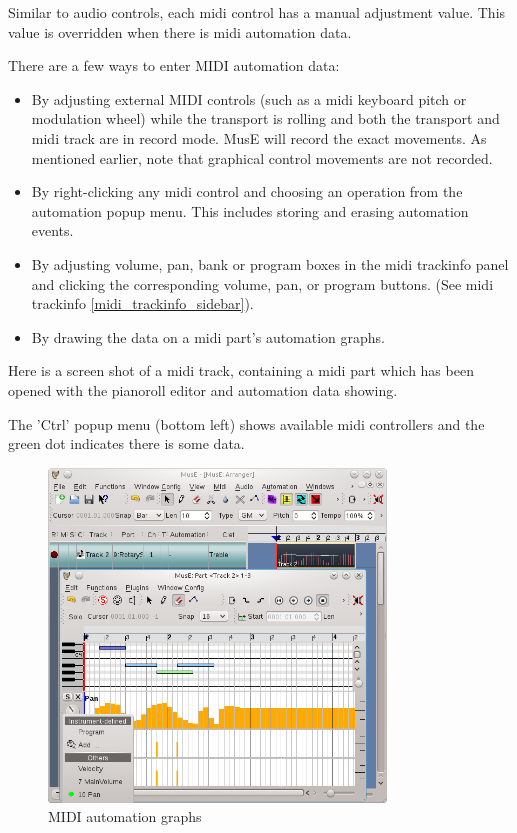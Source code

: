 \documentclass[a4paper]{report}
\newcommand{\screenshotwidth}[0]{0.8\textwidth}
\begin{document}
Similar to audio controls, each midi control has a manual adjustment
value. This value is overridden when there is midi automation data.

There are a few ways to enter MIDI automation data:
\begin{itemize}
\item By adjusting external MIDI controls (such as a midi keyboard
pitch or modulation wheel) while the transport is rolling and both
the transport and midi track are in record mode. MusE will record
the exact movements. As mentioned earlier, note that graphical control
movements are not recorded.                                                    %
\item By right-clicking any midi control and choosing an operation
from the automation popup menu. This includes storing and erasing
automation events.                                                             %
\item By adjusting volume, pan, bank or program boxes in the midi
trackinfo panel and clicking the corresponding volume, pan, or 
program buttons. (See midi trackinfo \ref{midi_trackinfo_sidebar}).
\item By drawing the data on a midi part's automation graphs.
\end{itemize}
Here is a screen shot of a midi track, containing a midi part
which has been opened with the pianoroll editor and automation                 %
data showing.
                                                         
The 'Ctrl' popup menu (bottom left) shows available midi controllers
and the green dot indicates there is some data.

\begin{figure}[htp]
\centering \includegraphics[width=\screenshotwidth]
{pics/main_window_with_midi_automation}
\caption{MIDI automation graphs}
\label{fig:midi_automation} 
\end{figure}
 
\end{document}
